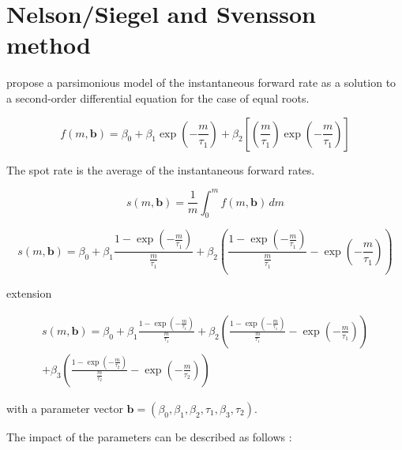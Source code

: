 \section{Nelson/Siegel and Svensson method}
\label{sec:nels-svenss-meth}

\cite{Nelson1987} propose a parsimonious  model of  the instantaneous forward rate as a solution to a second-order differential equation for the case of equal roots.

\begin{equation}
  \label{eq:laguerre}
  f(m,\bm{b}) = \beta_0+\beta_1\exp\left(-\frac{m}{\tau_1}\right)+\beta_2\left[\left(\frac{m}{\tau_1}\right)\exp\left(-\frac{m}{\tau_1}\right)\right]
\end{equation}


The spot rate is the average of the instantaneous forward rates. 

\begin{equation}
  \label{eq:intspotrate}
  s(m,\bm{b})=\frac{1}{m}\int_0^mf(m,\bm{b})\,dm
\end{equation}


\begin{equation}
  \label{eq:nelson-spot}
   s(m,\bm{b}) = \beta_0 + \beta_1\frac{1-\exp(-\frac{m}{\tau_1})}{\frac{m}{\tau_1}} + \beta_2\left(\frac{1-\exp(-\frac{m}{\tau_1})}{\frac{m}{\tau_1}} - \exp(-\frac{m}{\tau_1})\right)
\end{equation}


 
\cite{Svensson1994} extension


\begin{multline}\label{eq:svensson-spot}
    s(m,\bm{b}) = \beta_0 + \beta_1\frac{1-\exp(-\frac{m}{\tau_1})}{\frac{m}{\tau_1}} + \beta_2\left(\frac{1-\exp(-\frac{m}{\tau_1})}{\frac{m}{\tau_1}} - \exp(-\frac{m}{\tau_1})\right) \\+ \beta_3\left(\frac{1-\exp(-\frac{m}{\tau_2})}{\frac{m}{\tau_2}} - \exp(-\frac{m}{\tau_2})\right)
\end{multline}



with a parameter vector ${\bm{b}} = \left(\beta_0,\beta_1,\beta_2,\tau_1,\beta_3,\tau_2\right)$.

The impact of the parameters can be described as follows \citep[see][p.7]{Bolder1999}:

